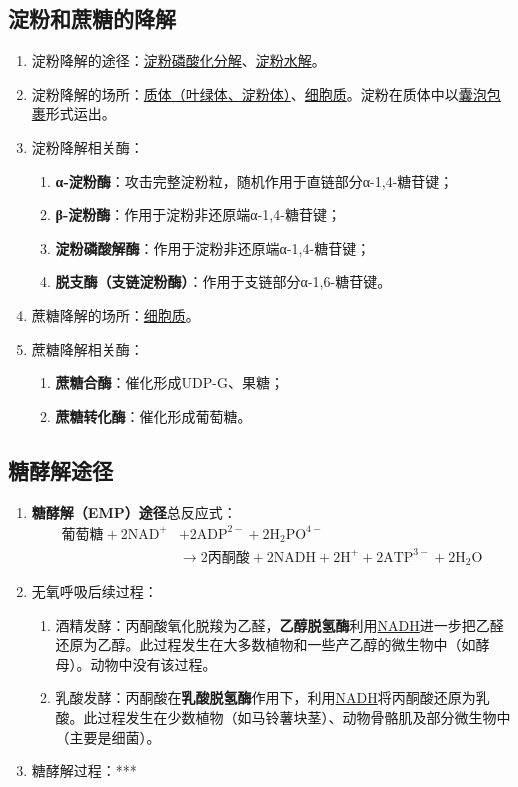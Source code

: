 \subsection{淀粉和蔗糖的降解}
\begin{enumerate}
    \item 淀粉降解的途径：\uline{淀粉磷酸化分解}、\uline{淀粉水解}。
    \item 淀粉降解的场所：\uline{质体（叶绿体、淀粉体）}、\uline{细胞质}。淀粉在质体中以\uline{囊泡包裹}形式运出。
    \item 淀粉降解相关酶：
    \begin{enumerate}
        \item \textbf{α-淀粉酶}：攻击完整淀粉粒，随机作用于直链部分α-1,4-糖苷键；
        \item \textbf{β-淀粉酶}：作用于淀粉非还原端α-1,4-糖苷键；
        \item \textbf{淀粉磷酸解酶}：作用于淀粉非还原端α-1,4-糖苷键；
        \item \textbf{脱支酶（支链淀粉酶）}：作用于支链部分α-1,6-糖苷键。
    \end{enumerate}
    \item 蔗糖降解的场所：\uline{细胞质}。
    \item 蔗糖降解相关酶：
    \begin{enumerate}
        \item \textbf{蔗糖合酶}：催化形成UDP-G、果糖；
        \item \textbf{蔗糖转化酶}：催化形成葡萄糖。
    \end{enumerate}
\end{enumerate}
\subsection{糖酵解途径}
\begin{enumerate}
    \item \textbf{糖酵解（EMP）途径}总反应式：
    \[\begin{aligned}
        \text{葡萄糖}+2\text{NAD}^+&+2\text{ADP}^{2-}+2\text{H}_2\text{PO}^{4-}\\&\to 2\text{丙酮酸}+2\text{NADH}+2\text{H}^++2\text{ATP}^{3-}+2\text{H}_2\text{O}
    \end{aligned}\]
    \item 无氧呼吸后续过程：
    \begin{enumerate}
        \item 酒精发酵：丙酮酸氧化脱羧为乙醛，\textbf{乙醇脱氢酶}利用\uline{NADH}进一步把乙醛还原为乙醇。此过程发生在大多数植物和一些产乙醇的微生物中（如酵母）。动物中没有该过程。
        \item 乳酸发酵：丙酮酸在\textbf{乳酸脱氢酶}作用下，利用\uline{NADH}将丙酮酸还原为乳酸。此过程发生在少数植物（如马铃薯块茎）、动物骨骼肌及部分微生物中（主要是细菌）。
    \end{enumerate}
    \item 糖酵解过程：***
\end{enumerate}
